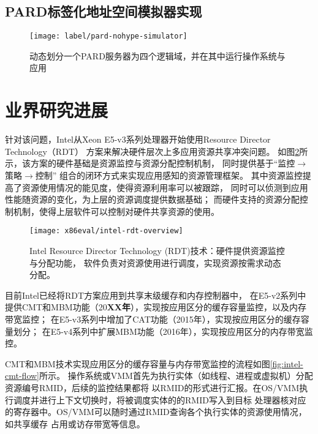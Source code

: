 \subsection{PARD标签化地址空间模拟器实现}



\begin{figure}[tb]
  \centering
  \texttt{[image: label/pard-nohype-simulator]}
  \caption{动态划分一个PARD服务器为四个逻辑域，并在其中运行操作系统与应用}
  \label{fig:pard-nohype-simulator}
\end{figure}

\section{业界研究进展}

针对该问题，Intel从Xeon E5-v3系列处理器开始使用Resource Director Technology（RDT）
方案来解决硬件层次上多应用资源共享冲突问题。
如图\ref{fig:intel-rdt-overview}所示，该方案的硬件基础是资源监控与资源分配控制机制，
同时提供基于``监控$\rightarrow$策略$\rightarrow$控制''
组合的闭环方式来实现应用感知的资源管理框架。
其中资源监控提高了资源使用情况的能见度，使得资源利用率可以被跟踪，
同时可以侦测到应用性能随资源的变化，为上层的资源调度提供数据基础；
而硬件支持的资源分配控制机制，使得上层软件可以控制对硬件共享资源的使用。

\begin{figure}[H]
  \centering
  \texttt{[image: x86eval/intel-rdt-overview]}
  \caption[Intel Resource Director Technology (RDT) 技术示意图]{
    Intel Resource Director Technology (RDT)技术：硬件提供资源监控与分配功能，
    软件负责对资源使用进行调度，实现资源按需求动态分配。}
  \label{fig:intel-rdt-overview}
\end{figure}

目前Intel已经将RDT方案应用到共享末级缓存和内存控制器中，
在E5-v2系列中提供CMT和MBM功能（20\textbf{XX年}），实现按应用区分的缓存容量监控，以及内存带宽监控；
在E5-v3系列中增加了CAT功能（2015年），实现按应用区分的缓存容量划分；
在E5-v4系列中扩展MBM功能（2016年），实现按应用区分的内存带宽监控。

CMT和MBM技术实现应用区分的缓存容量与内存带宽监控的流程如图\ref{fig:intel-cmt-flow}所示。
操作系统或VMM首先为执行实体（如线程、进程或虚拟机）分配资源编号RMID，后续的监控结果都将
以RMID的形式进行汇报。在OS/VMM执行调度并进行上下文切换时，将被调度实体的的RMID写入到目标
处理器核对应的寄存器中。OS/VMM可以随时通过RMID查询各个执行实体的资源使用情况，如共享缓存
占用或访存带宽等信息。
 

